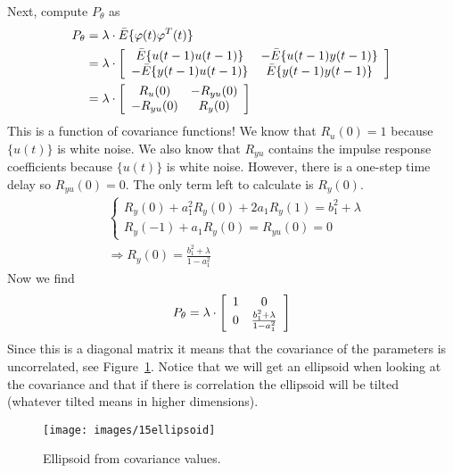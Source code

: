 \begin{example}
Next, compute $P_\theta$ as
\begin{align*}
P_\theta &= \lambda\cdot \bar{E}\{\varphi(t)\varphi^T(t)\} \\
&= \lambda\cdot \left[\begin{array}{c c}
\bar{E}\{u(t-1)u(t-1)\} & -\bar{E}\{u(t-1)y(t-1)\} \\
-\bar{E}\{y(t-1)u(t-1)\} & \bar{E}\{y(t-1)y(t-1)\}
\end{array}\right] \\
&= \lambda\cdot \left[\begin{array}{c c}
R_u(0) & -R_{yu}(0) \\ -R_{yu}(0) & R_y(0)
\end{array}\right]
\end{align*}
This is a function of covariance functions! We know that $R_u(0)=1$ because $\{u(t)\}$ is white noise.
We also know that $R_{yu}$ contains the impulse response coefficients because $\{u(t)\}$ is white noise.
However, there is a one-step time delay so $R_{yu}(0) = 0$.
The only term left to calculate is $R_y(0)$.
\begin{align*}
&\begin{cases} R_y(0) + a_1^2R_y(0)+2a_1R_y(1) = b_1^2+\lambda \\ R_y(-1)+a_1R_y(0) = R_{yu}(0) = 0 \end{cases} \\
&\Rightarrow R_y(0) = \frac{b_1^2+\lambda}{1-a_1^2}
\end{align*}
Now we find
$$P_\theta = \lambda\cdot \left[\begin{array}{c c} 1 & 0 \\ 0 & \frac{b_1^2+\lambda}{1-a_1^2} \end{array}\right]$$
Since this is a diagonal matrix it means that the covariance of the parameters is uncorrelated, see Figure~\ref{fig:15ellipsoid}.
Notice that we will get an ellipsoid when looking at the covariance and that if there is correlation the ellipsoid will be tilted (whatever tilted means in higher dimensions).

\begin{figure}[ht!]
	\centering
	\texttt{[image: images/15ellipsoid]}
	\caption{Ellipsoid from covariance values.}
	\label{fig:15ellipsoid}
\end{figure}


\end{example}
